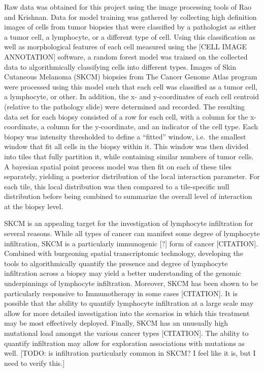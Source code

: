 \documentclass[
]{book}
\begin{document}
Raw data was obtained for this project using the image processing tools
of Rao and Krishnan. Data for model training was gathered by collecting
high definition images of cells from tumor biopsies that were classified
by a pathologist as either a tumor cell, a lymphocyte, or a different
type of cell. Using this classification as well as morphological
features of each cell measured using the {[}CELL IMAGE ANNOTATION{]}
software, a random forest model was trained on the collected data to
algorithmically classifying cells into different types. Images of Skin
Cutaneous Melanoma (SKCM) biopsies from The Cancer Genome Atlas program
were processed using this model such that each cell was classified as a
tumor cell, a lymphocyte, or other. In addition, the x- and
y-coordinates of each cell centroid (relative to the pathology slide)
were determined and recorded. The resulting data set for each biopsy
consisted of a row for each cell, with a column for the x-coordinate, a
column for the y-coordinate, and an indicator of the cell type. Each
biopsy was intensity thresholded to define a ``fitted'' window, i.e.~the
smallest window that fit all cells in the biopsy within it. This window
was then divided into tiles that fully partition it, while containing
similar numbers of tumor cells. A bayesian spatial point process model
was then fit on each of these tiles separately, yielding a posterior
distribution of the local interaction parameter. For each tile, this
local distribution was then compared to a tile-specific null
distribution before being combined to summarize the overall level of
interaction at the biopsy level.

SKCM is an appealing target for the investigation of lymphocyte
infiltration for several reasons. While all types of cancer can manifest
some degree of lymphocyte infiltration, SKCM is a particularly
immunogenic {[}?{]} form of cancer {[}CITATION{]}. Combined with burgeoning
spatial transcriptomic technology, developing the tools to
algorithmically quantify the presence and degree of lymphocyte
infiltration across a biopsy may yield a better understanding of the
genomic underpinnings of lymphocyte infiltration. Moreover, SKCM has
been shown to be particularly responsive to Immunotherapy in some cases
{[}CITATION{]}. It is possible that the ability to quantify lymphocyte
infiltration at a large scale may allow for more detailed investigation
into the scenarios in which this treatment may be most effectively
deployed. Finally, SKCM has an unusually high mutational load amongst
the various cancer types {[}CITATION{]}. The ability to quantify
infiltration may allow for exploration associations with mutations as
well. {[}TODO: is infiltration particularly common in SKCM? I feel like
it is, but I need to verify this.{]}
\end{document}
